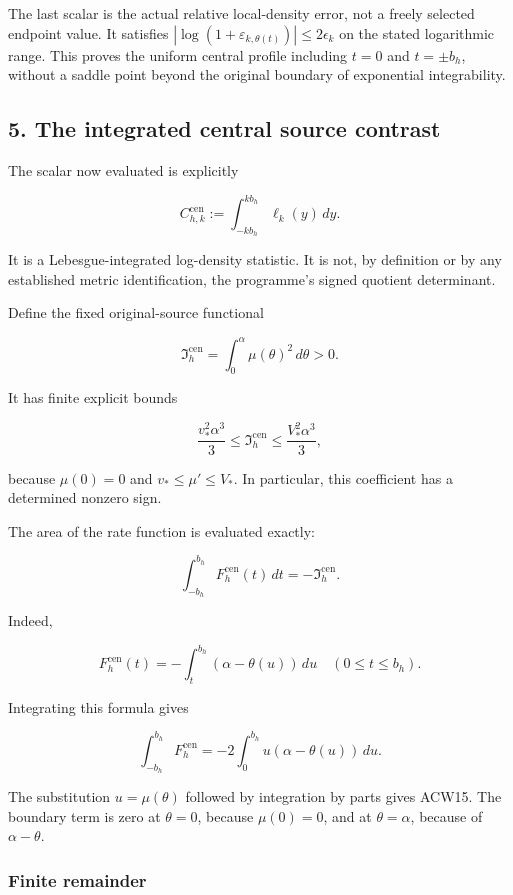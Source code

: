 The last scalar is the actual relative local-density error, not a freely selected endpoint value. It satisfies
\(|\log(1+\varepsilon_{k,\theta(t)})|\le2\epsilon_k\) on the stated logarithmic range. This proves the uniform central profile including \(t=0\) and \(t=\pm b_h\), without a saddle point beyond the original boundary of exponential integrability.

\subsection{5. The integrated central source contrast}\label{acw:the-integrated-central-source-contrast}

The scalar now evaluated is explicitly

\[
C_{h,k}^{\mathrm{cen}}:=
\int_{-kb_h}^{kb_h}\ell_k(y)\,dy.
\]

It is a Lebesgue-integrated log-density statistic. It is not, by definition or by any established metric identification, the programme's signed quotient determinant.

Define the fixed original-source functional

\[
\mathfrak I_h^{\mathrm{cen}}
=\int_0^\alpha\mu(\theta)^2\,d\theta>0.
\tag{ACW14}
\]

It has finite explicit bounds

\[
\frac{v_*^2\alpha^3}{3}\le\mathfrak I_h^{\mathrm{cen}}
\le\frac{V_*^2\alpha^3}{3},
\]

because \(\mu(0)=0\) and \(v_*\le\mu'\le V_*\). In particular, this coefficient has a determined nonzero sign.

The area of the rate function is evaluated exactly:

\[
\boxed{
\int_{-b_h}^{b_h}F_h^{\mathrm{cen}}(t)\,dt
=-\mathfrak I_h^{\mathrm{cen}}.}
\tag{ACW15}
\]

Indeed,

\[
F_h^{\mathrm{cen}}(t)
=-\int_t^{b_h}(\alpha-\theta(u))\,du
\quad(0\le t\le b_h).
\]

Integrating this formula gives

\[
\int_{-b_h}^{b_h}F_h^{\mathrm{cen}}
=-2\int_0^{b_h}u(\alpha-\theta(u))\,du.
\]

The substitution \(u=\mu(\theta)\) followed by integration by parts gives ACW15. The boundary term is zero at \(\theta=0\), because \(\mu(0)=0\), and at \(\theta=\alpha\), because of \(\alpha-\theta\).

\subsubsection{Finite remainder}\label{acw:finite-remainder}

